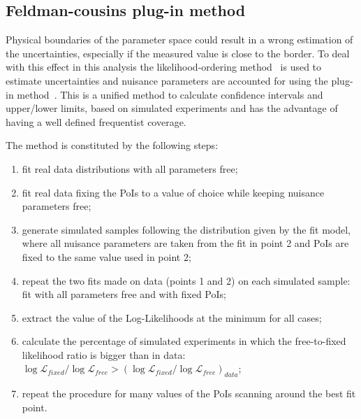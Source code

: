 \subsection{Feldman-cousins plug-in method}
\label{sec:FeldmanCousins}

Physical boundaries of the parameter space could result in a wrong estimation of the uncertainties,
especially if the measured value is close to the border. To deal with this effect in this analysis the 
likelihood-ordering method~\cite{Feldman:1997qc} is used to estimate uncertainties and
nuisance parameters are accounted for using the plug-in method~\cite{Karbach:2011uz}. This is a unified 
method to calculate confidence intervals and upper/lower limits, based on simulated experiments and has 
the advantage of having a well defined frequentist coverage.


The method is constituted by the following steps:
\begin{enumerate}
\item fit real data distributions with all parameters free;
\item fit real data fixing the PoIs to a value of choice while keeping nuisance parameters free;
\item generate simulated samples following the distribution given by the fit model,
where all nuisance parameters are taken from the fit in point 2 and PoIs are fixed to the same value used in point 2;
\item repeat the two fits made on data (points 1 and 2) on each simulated sample: fit with all parameters free and with fixed PoIs;
\item extract the value of the Log-Likelihoods at the minimum for all cases;
\item calculate the percentage of simulated experiments in which the free-to-fixed likelihood ratio
is bigger than in data: $\log\mathcal{L}_{fixed}/\log\mathcal{L}_{free} > (\log\mathcal{L}_{fixed}/\log\mathcal{L}_{free})_{data}$;
\item repeat the procedure for many values of the PoIs scanning around the best fit point.
\end{enumerate}

